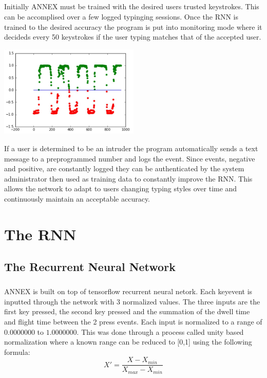 \documentclass[fancychapters]{report}
\begin{document}
\paragraph{}Initially ANNEX must be trained with the desired users trusted keystrokes.  This can be accomplised over a few logged typinging sessions. 
Once the RNN is trained to the desired accuracy the program is put into monitoring mode where it decideds every 50 keystrokes if the user typing matches that of the accepted user.
\begin{center}
\includegraphics[width=0.5\textwidth]{graph2}
\end{center}
If a user is determined to be an intruder the program automatically sends a text message to a preprogrammed number and logs the event.
Since events, negative and positive, are constantly logged they can be  authenticated by the system administrator then used as training data to constantly improve the RNN. 
This allows the network to adapt to users changing typing styles over time and continuously maintain an acceptable accuracy.

\chapter{The RNN}
\section{The Recurrent Neural Network}
\paragraph{}ANNEX is built on top of tensorflow recurrent neural netork.  Each keyevent is inputted through the network with 3 normalized values.
The three inputs are the first key pressed, the second key pressed and the summation of the dwell time and flight time between the 2 press events. 
Each input is normalized to a range of $0.0000000$ to $1.0000000$. 
This was done through a process called unity based normalization where a known range can be reduced to [0,1] using the following formula:
$$X' = \frac{X - X_{min}}{X_{max}-X_{min}}$$
\end{document}
